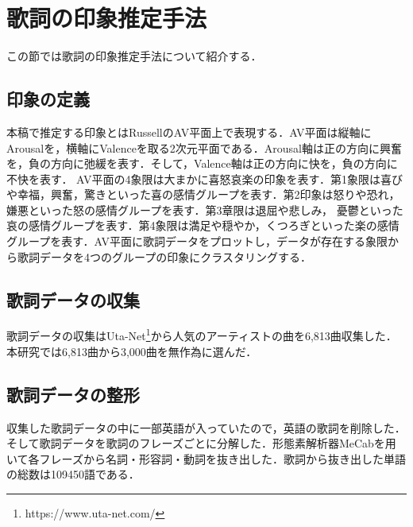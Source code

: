 \section{歌詞の印象推定手法}
この節では歌詞の印象推定手法について紹介する．

\subsection{印象の定義}
本稿で推定する印象とはRussellのAV平面上で表現する．AV平面は縦軸にArousalを，横軸にValenceを取る2次元平面である．Arousal軸は正の方向に興奮を，負の方向に弛緩を表す．そして，Valence軸は正の方向に快を，負の方向に不快を表す．
AV平面の4象限は大まかに喜怒哀楽の印象を表す．第1象限は喜びや幸福，興奮，驚きといった喜の感情グループを表す．第2印象は怒りや恐れ，嫌悪といった怒の感情グループを表す．第3章限は退屈や悲しみ，
憂鬱といった哀の感情グループを表す．第4象限は満足や穏やか，くつろぎといった楽の感情グループを表す．AV平面に歌詞データをプロットし，データが存在する象限から歌詞データを4つのグループの印象にクラスタリングする．

\subsection{歌詞データの収集}
歌詞データの収集はUta-Net\footnote{https://www.uta-net.com/}から人気のアーティストの曲を6,813曲収集した．本研究では6,813曲から3,000曲を無作為に選んだ．

\subsection{歌詞データの整形}
収集した歌詞データの中に一部英語が入っていたので，英語の歌詞を削除した．そして歌詞データを歌詞のフレーズごとに分解した．形態素解析器MeCabを用いて各フレーズから名詞・形容詞・動詞を抜き出した．歌詞から抜き出した単語の総数は109450語である．

